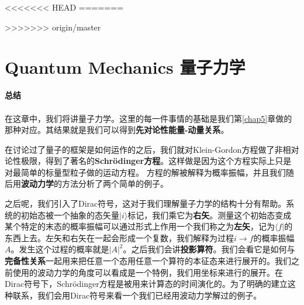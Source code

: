 
<<<<<<< HEAD
=======

>>>>>>> origin/master
\def\pmm{\begin{pmatrix}}
\def\pmme{\end{pmatrix}}

\chapter[量子力学]{Quantum Mechanics 量子力学}\label{chap8}

{\Huge\bf 总结\\ \ \\}
在这章中，我们将讲量子力学。这里的每一件事情的基础是我们第\ref{chap5}章做的那种对应。其结果就是我们可以得到{\bf 先对论性能量-动量关系}。

在讨论过了量子的框架是如何运作的之后，我们就对Klein-Gordon方程做了非相对论性极限，得到了著名的{\bf Schrödinger方程}。这样做是因为这个方程实际上只是对最简单的标量型粒子做的运动方程。
方程的解被解释为概率振幅，并且我们随后用{\bf 波动力学}的方法分析了两个简单的例子。

之后呢，我们引入了{Dirac符号}，这对于我们理解量子力学的结构十分有帮助。系统的初始态被一个抽象的态矢量$|i\rangle$标记，我们乘它为{\bf 右矢}。测量这个初始态变成某个特定的末态的概率振幅可以通过形式上作用一个我们称之为{\bf 左矢}，记为$\langle f|$的东西上去。左矢和右矢在一起会形成一个复数，我们解释为过程$i\to f$的概率振幅$A$。发生这个过程的概率就是$|A|^2$。之后我们会讲{\bf 投影算符}。我们会看它是如何与{\bf 完备性关系}一起用来把任意一个态用任意一个算符的本征态来进行展开的。我们之前使用的波动力学的角度可以看成是一个特例，我们用坐标来进行的展开。在Dirac符号下，Schrödinger方程是被用来计算态的时间演化的。为了明确的建立这种联系，我们会用Dirac符号来看一个我们已经用波动力学解过的例子。

